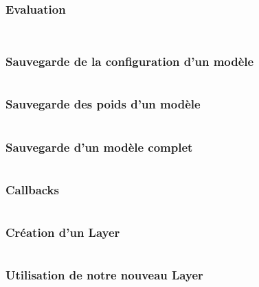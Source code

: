 \begin{frame}
  \frametitle{Evaluation}
  \inputminted[linenos,fontsize=\small,bgcolor=pythonbg]{python}{code-illustration/tf-keras-predict.py}
  \inputminted[linenos,fontsize=\small,bgcolor=returnbg]{text}{code-illustration/tf-keras-predict.txt}
\end{frame}

\begin{frame}
  \frametitle{Sauvegarde de la configuration d'un modèle}
  \inputminted[linenos,fontsize=\small,bgcolor=pythonbg]{python}{code-illustration/tf-keras-save-config.py}
\end{frame}

\begin{frame}
  \frametitle{Sauvegarde des poids d'un modèle}
  \inputminted[linenos,fontsize=\small,bgcolor=pythonbg]{python}{code-illustration/tf-keras-save-weights.py}
\end{frame}

\begin{frame}
  \frametitle{Sauvegarde d'un modèle complet}
  \inputminted[linenos,fontsize=\small,bgcolor=pythonbg]{python}{code-illustration/tf-keras-save-all.py}
\end{frame}

\begin{frame}
  \frametitle{Callbacks}
  \inputminted[linenos,fontsize=\small,bgcolor=pythonbg]{python}{code-illustration/tf-keras-callbacks.py}
\end{frame}

\begin{frame}
  \frametitle{Création d'un Layer}
  \inputminted[linenos,fontsize=\small,bgcolor=pythonbg]{python}{code-illustration/tf-keras-custom-layer.py}
\end{frame}

\begin{frame}
  \frametitle{Utilisation de notre nouveau Layer}
  \inputminted[linenos,fontsize=\small,bgcolor=pythonbg]{python}{code-illustration/tf-keras-custom-layer-use.py}
\end{frame}


